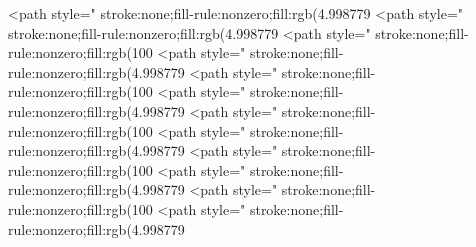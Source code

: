 <path style=" stroke:none;fill-rule:nonzero;fill:rgb(4.998779%
<path style=" stroke:none;fill-rule:nonzero;fill:rgb(4.998779%
<path style=" stroke:none;fill-rule:nonzero;fill:rgb(100%
<path style=" stroke:none;fill-rule:nonzero;fill:rgb(4.998779%
<path style=" stroke:none;fill-rule:nonzero;fill:rgb(100%
<path style=" stroke:none;fill-rule:nonzero;fill:rgb(4.998779%
<path style=" stroke:none;fill-rule:nonzero;fill:rgb(100%
<path style=" stroke:none;fill-rule:nonzero;fill:rgb(4.998779%
<path style=" stroke:none;fill-rule:nonzero;fill:rgb(100%
<path style=" stroke:none;fill-rule:nonzero;fill:rgb(4.998779%
<path style=" stroke:none;fill-rule:nonzero;fill:rgb(100%
<path style=" stroke:none;fill-rule:nonzero;fill:rgb(4.998779%

